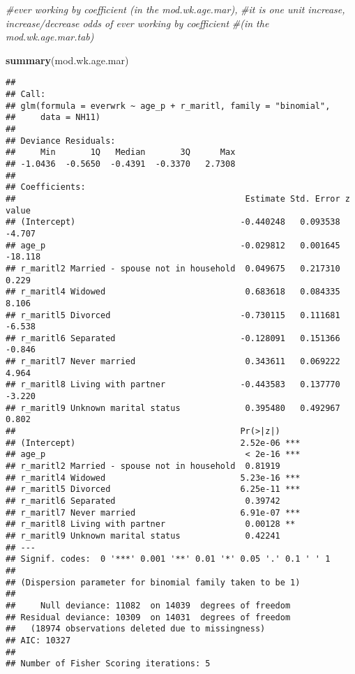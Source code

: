 \documentclass[]{article}
\newenvironment{Shaded}{\begin{snugshade}}{\end{snugshade}}
\newcommand{\KeywordTok}[1]{\textcolor[rgb]{0.13,0.29,0.53}{\textbf{#1}}}
\newcommand{\CommentTok}[1]{\textcolor[rgb]{0.56,0.35,0.01}{\textit{#1}}}
\newcommand{\NormalTok}[1]{#1}
\begin{document}
\begin{Shaded}
\begin{Highlighting}[]
                     \CommentTok{#ever working by coefficient (in the mod.wk.age.mar), }
                     \CommentTok{#it is one unit increase, increase/decrease odds of ever working by coefficient}
                     \CommentTok{#(in the mod.wk.age.mar.tab)}

\KeywordTok{summary}\NormalTok{(mod.wk.age.mar)}
\end{Highlighting}
\end{Shaded}

\begin{verbatim}
## 
## Call:
## glm(formula = everwrk ~ age_p + r_maritl, family = "binomial", 
##     data = NH11)
## 
## Deviance Residuals: 
##     Min       1Q   Median       3Q      Max  
## -1.0436  -0.5650  -0.4391  -0.3370   2.7308  
## 
## Coefficients:
##                                              Estimate Std. Error z value
## (Intercept)                                 -0.440248   0.093538  -4.707
## age_p                                       -0.029812   0.001645 -18.118
## r_maritl2 Married - spouse not in household  0.049675   0.217310   0.229
## r_maritl4 Widowed                            0.683618   0.084335   8.106
## r_maritl5 Divorced                          -0.730115   0.111681  -6.538
## r_maritl6 Separated                         -0.128091   0.151366  -0.846
## r_maritl7 Never married                      0.343611   0.069222   4.964
## r_maritl8 Living with partner               -0.443583   0.137770  -3.220
## r_maritl9 Unknown marital status             0.395480   0.492967   0.802
##                                             Pr(>|z|)    
## (Intercept)                                 2.52e-06 ***
## age_p                                        < 2e-16 ***
## r_maritl2 Married - spouse not in household  0.81919    
## r_maritl4 Widowed                           5.23e-16 ***
## r_maritl5 Divorced                          6.25e-11 ***
## r_maritl6 Separated                          0.39742    
## r_maritl7 Never married                     6.91e-07 ***
## r_maritl8 Living with partner                0.00128 ** 
## r_maritl9 Unknown marital status             0.42241    
## ---
## Signif. codes:  0 '***' 0.001 '**' 0.01 '*' 0.05 '.' 0.1 ' ' 1
## 
## (Dispersion parameter for binomial family taken to be 1)
## 
##     Null deviance: 11082  on 14039  degrees of freedom
## Residual deviance: 10309  on 14031  degrees of freedom
##   (18974 observations deleted due to missingness)
## AIC: 10327
## 
## Number of Fisher Scoring iterations: 5
\end{verbatim}
\end{document}
